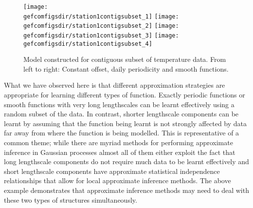 \begin{figure}[ht]
\centering
\texttt{[image: \\gefcomfigsdir/station1contigsubset\_1]}
\texttt{[image: \\gefcomfigsdir/station1contigsubset\_2]}
\texttt{[image: \\gefcomfigsdir/station1contigsubset\_3]}
\texttt{[image: \\gefcomfigsdir/station1contigsubset\_4]}
\caption[Model constructed for contiguous subset of temperature data]{
Model constructed for contiguous subset of temperature data. From left to right: Constant offset, daily periodicity and smooth functions.
}
\label{fig:gefcom:contig}
\end{figure}

What we have observed here is that different approximation strategies are appropriate for learning different types of function.
Exactly periodic functions or smooth functions with very long lengthscales can be learnt effectively using a random subset of the data.
In contrast, shorter lengthscale components can be learnt by assuming that the function being learnt is not strongly affected by data far away from where the function is being modelled.
This is representative of a common theme; while there are myriad methods for performing approximate inference in Gaussian processes almost all of them either exploit the fact that long lengthscale components do not require much data to be learnt effectively and short lengthscale components have approximate statistical independence relationships that allow for local approximate inference methods.
The above example demonstrates that approximate inference methods may need to deal with these two types of structures simultaneously.

